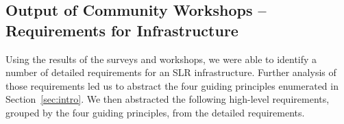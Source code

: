 
\subsection{Output of Community Workshops -- Requirements for Infrastructure}
\label{sec:results:workshops}
Using the results of the surveys and workshops, we were able to identify a number of detailed requirements for an SLR infrastructure.
Further analysis of those requirements led us to abstract the four guiding principles enumerated in Section~\ref{sec:intro}.
We then abstracted the following high-level requirements, grouped by the four guiding principles, from the detailed requirements.

